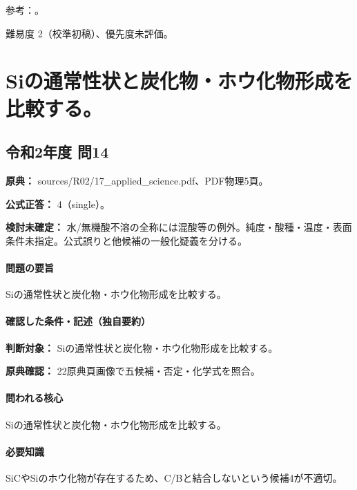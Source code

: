 \par 参考：\cite{qualitative_stanford,inorganic_zinc_ref}。

\par 難易度 2（校準初稿）、優先度未評価。

\section{Siの通常性状と炭化物・ホウ化物形成を比較する。}

\subsection{令和2年度 問14}
\label{q:r02-reg-applied-14}

\noindent\textbf{原典：} sources/R02/17\_applied\_science.pdf、PDF物理5頁。

\textbf{公式正答：} 4（single）。

\par\textbf{検討未確定：} 水/無機酸不溶の全称には混酸等の例外。純度・酸種・温度・表面条件未指定。公式誤りと他候補の一般化疑義を分ける。

\paragraph{問題の要旨} Siの通常性状と炭化物・ホウ化物形成を比較する。

\paragraph{確認した条件・記述（独自要約）}\mbox{}\par

\noindent\textbf{判断対象：} Siの通常性状と炭化物・ホウ化物形成を比較する。\par

\noindent\textbf{原典確認：} 22原典頁画像で五候補・否定・化学式を照合。\par

\paragraph{問われる核心} Siの通常性状と炭化物・ホウ化物形成を比較する。

\paragraph{必要知識} SiCやSiのホウ化物が存在するため、C/Bと結合しないという候補4が不適切。

